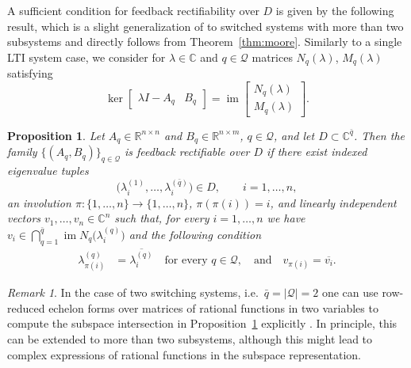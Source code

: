 \documentclass[11pt]{article}
\newcommand{\R}{\mathbb{R}}
\newcommand{\C}{\mathbb{C}}
\DeclareMathOperator{\im}{im}
\theoremstyle{plain}
\newtheorem{proposition}[theorem]{Proposition}
\theoremstyle{definition}
\theoremstyle{remark}
\newtheorem{remark}[theorem]{Remark}
\begin{document}
A sufficient condition for feedback rectifiability over $D$ is given by the following result, which is a slight generalization of \cite{HoneckerGWTR24} to switched systems with more than two subsystems and directly follows from Theorem~\ref{thm:moore}. Similarly to a single LTI system case, we consider for $\lambda\in\C$ and $q\in\mathcal Q$ matrices $N_q(\lambda)$, $M_q(\lambda)$ satisfying
\begin{equation}
    \ker \begin{bmatrix}
        \lambda I-A_q & B_q
    \end{bmatrix} = \im \begin{bmatrix}
        N_q(\lambda)\\
        M_q(\lambda)
    \end{bmatrix}.
\end{equation}

\begin{proposition}
\label{prop:rect}
Let $A_q\in\R^{n\times n}$ and $B_q\in\R^{n\times m}$, $q\in\mathcal{Q}$, and let $D\subset\C^{\bar q}$.
Then the family $\{(A_q,B_q)\}_{q\in\mathcal Q}$ is feedback
rectifiable over $D$ if there exist indexed eigenvalue tuples
\[
    \bigl(
        \lambda_i^{(1)},\ldots,\lambda_i^{(\bar q)}
    \bigr)
    \in D,
    \qquad i=1,\ldots,n,
\]
an involution
$\pi:\{1,\ldots,n\}\to\{1,\ldots,n\}$, $\pi(\pi(i))=i$,
and linearly independent vectors
$v_1,\ldots,v_n\in\mathbb C^n$ such that, for every
$i=1,\ldots,n$ we have  $v_i\in
        \bigcap_{q=1}^{\bar q}
        \operatorname{im}N_q\bigl(\lambda_i^{(q)}\bigr)$ and the following condition
\begin{align}
    \lambda_{\pi(i)}^{(q)}
        &= \overline{\lambda_i^{(q)}}
        \quad \text{for every } q\in\mathcal Q, \quad \text{and} \quad    v_{\pi(i)}
        = \overline{v_i}. \label{eq:tuple_conjugacy}
\end{align}
\end{proposition}

\begin{remark}
In the case of two switching systems, i.e.\ $\bar q=|\mathcal{Q}|=2$ one can use row-reduced echelon forms over matrices of rational functions in two variables to compute the subspace intersection in Proposition~\ref{prop:rect} explicitly \cite{HoneckerGWTR24}. In principle, this can be extended to more than two subsystems, although this might lead to complex expressions of rational functions in the subspace representation.
\end{remark}
\end{document}
